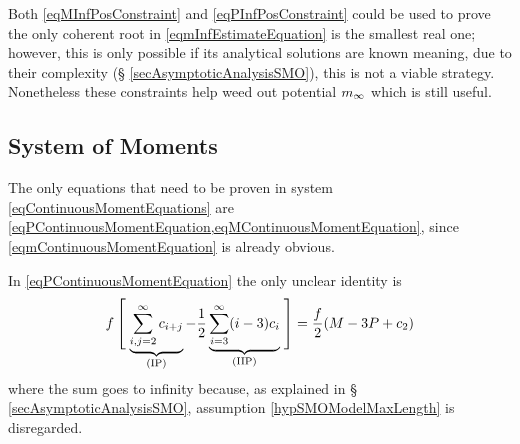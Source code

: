                 Both \eqref{eqMInfPosConstraint} and \eqref{eqPInfPosConstraint} could be used to prove the only coherent root in \eqref{eqmInfEstimateEquation} is the smallest real one; however, this is only possible if its analytical solutions are known meaning, due to their complexity (§ \ref{secAsymptoticAnalysisSMO}), this is not a viable strategy. Nonetheless these constraints help weed out potential $m_\infty$ which is still useful.


            \subsection{System of Moments}\label{apxSystemOfMoments}

                The only equations that need to be proven in system \eqref{eqContinuousMomentEquations} are \cref{eqPContinuousMomentEquation,eqMContinuousMomentEquation}, since \eqref{eqmContinuousMomentEquation} is already obvious.

                In \eqref{eqPContinuousMomentEquation} the only unclear identity is
                \begin{equation}
                    f\left[\vphantom{\sum_{i,j=2}^\infty}\right.%
                    \underbrace{\sum_{i,j=2}^\infty c_{i+j}}_{(\text{IP})}
                    -\frac12\underbrace{\sum_{i=3}^\infty(i-3)c_i}_{(\text{IIP})}
                    \left.\vphantom{\sum_{i,j=2}^\infty}\right]=\frac f2(M-3P+c_2)
                    \label{eqSysMomDerUnclearIdentityP}
                \end{equation}
                where the sum goes to infinity because, as explained in § \ref{secAsymptoticAnalysisSMO}, assumption \ref{hypSMOModelMaxLength} is disregarded.

